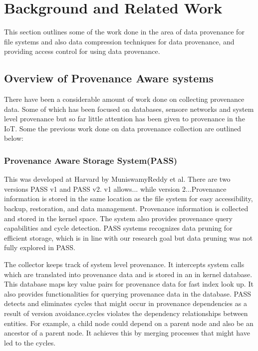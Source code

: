 
\chapter{Background and Related Work}\label{background}

This section outlines some of the work done in the area of data provenance for file systems and also data compression techniques for data provenance, and providing access control for using data provenance.

\section{Overview of Provenance Aware systems}

There have been a considerable amount of work done on collecting provenance data. Some of which has been focused on databases, sensore networks and system level provenance but so far little attention has been given to provenance in the IoT. Some the previous work done on data provenance collection are outlined below:

\subsection{Provenance Aware Storage System(PASS)}

This was developed at Harvard by MuniswamyReddy
et al. There are two versions PASS v1 and PASS v2. v1 allows... while version 2...Provenance information
is stored in the same location as the file system for easy accessibility, backup,
restoration, and data management. Provenance information is collected and stored in
the kernel space. The system also provides provenance query capabilities and cycle
detection. PASS systems recognizes data pruning for efficient storage, which is in line
with our research goal but data pruning was not fully explored in PASS.

The collector keeps track of system level provenance. It intercepts system calls which are translated into provenance data and is stored in an in kernel database. This database maps key value pairs for provenance data for fast index look up. It also provides functionalities for querying provenance data in the database. PASS detects and eliminates cycles that might occur in provenance dependencies as a result of version avoidance.cycles violates the dependency relationships between entities. For example, a child node could depend on a parent node and also be an ancestor of a parent node. It achieves this by merging processes that might have led to the cycles.

